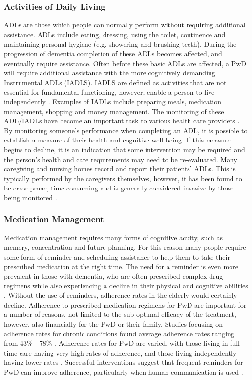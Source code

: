 \subsubsection{Activities of Daily Living}
ADLs are those which people can normally perform without requiring additional assistance. ADLs include eating, dressing, using the toilet, continence and maintaining personal hygiene (e.g. showering and brushing teeth). During the progression of dementia completion of these ADLs becomes affected, and eventually require assistance. Often before these basic ADLs are affected, a PwD will require additional assistance with the more cognitively demanding Instrumental ADLs (IADLS). IADLS are defined as activities that are not essential for fundamental functioning, however, enable a person to live independently \cite{Bookman2007}. Examples of IADLs include preparing meals, medication management, shopping and money management.
The monitoring of these ADL/IADLs have become an important task to various health care providers \cite{Philipose2004}. By monitoring someone's performance when completing an ADL, it is possible to establish a measure of their health and cognitive well-being. If this measure begins to decline, it is an indication that some intervention may be required and the person's health and care requirements may need to be re-evaluated. Many caregiving and nursing homes record and report their patients' ADLs.
This is typically performed by the caregivers themselves, however, it has been found to be error prone, time consuming and is generally considered invasive by those being monitored \cite{McDonald2001}.

\subsubsection{Medication Management}
Medication management requires many forms of cognitive acuity, such as memory, concentration and future planning. For this reason many people require some form of reminder and scheduling assistance to help them to take their prescribed medication at the right time. The need for a reminder is even more prevalent in those with dementia, who are often prescribed complex drug regimens while also experiencing a decline in their physical and cognitive abilities \cite{Elliott2009}.
Without the use of reminders, adherence rates in the elderly would certainly decline. Adherence to prescribed medication regimens for PwD are important for a number of reasons, not limited to the sub-optimal efficacy of the treatment, however, also financially for the PwD or their family. Studies focusing on adherence rates for chronic conditions found average adherence rates ranging from 43\% - 78\% \cite{Claxton2001, Cramer2003}. Adherence rates for PwD are varied, with those living in full time care having very high rates of adherence, and those living independently having lower rates \cite{Campbell2012a}.  Successful interventions suggest that frequent reminders for PwD can improve adherence, particularly when human communication is used \cite{Campbell2012a}.

